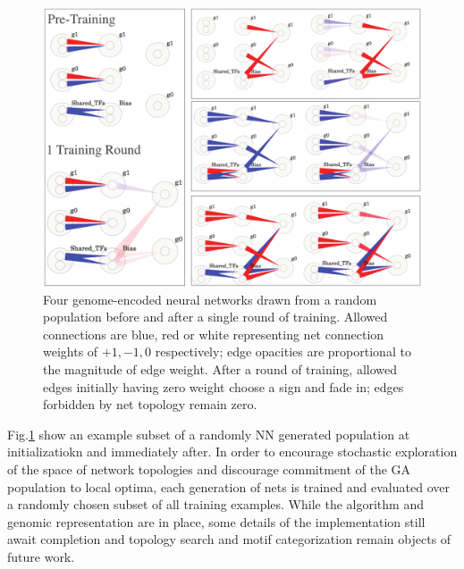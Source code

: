 \documentclass[12pt,a4paper]{article}
\begin{document}
\begin{multicols}{2}
\begin{figure}[h]
\includegraphics[width = 5in]{figs/GA_pop}
\caption{Four genome-encoded neural networks drawn from a random population before and after a single round of training. Allowed connections are blue, red or white representing net connection weights of $+1,-1,0$ respectively; edge opacities are proportional to the magnitude of edge weight. After a round of training, allowed edges initially having zero weight choose a sign and fade in; edges forbidden by net topology remain zero.}
\label{fig:gapop}
\end{figure}

Fig.\ref{fig:gapop} show an example subset of a randomly NN generated population at initializatiokn and immediately after. In order to encourage stochastic exploration of the space of network topologies and discourage commitment of the GA population to local optima, each generation of nets is trained and evaluated over a randomly chosen subset of all training examples. While the algorithm and genomic representation are in place, some details of the implementation still await completion and topology search and motif categorization remain objects of future work.


\end{multicols}
\end{document}
